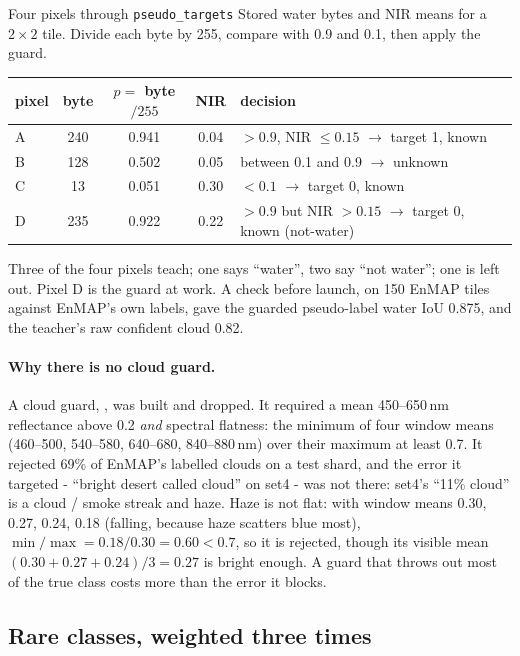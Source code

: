 \begin{worked}[label={we:ftruns:pseudo}]{Four pixels through \texttt{pseudo\_targets}}
Stored water bytes and NIR means for a $2 \times 2$ tile. Divide each byte by 255, compare with 0.9 and 0.1, then
apply the guard.
\begin{center}
\small
\begin{tabular}{lcccl}
\toprule
pixel & byte & $p = $ byte$/255$ & NIR & decision \\
\midrule
A & 240 & 0.941 & 0.04 & $> 0.9$, NIR $\le 0.15$ $\to$ target 1, known \\
B & 128 & 0.502 & 0.05 & between 0.1 and 0.9 $\to$ unknown \\
C & 13 & 0.051 & 0.30 & $< 0.1$ $\to$ target 0, known \\
D & 235 & 0.922 & 0.22 & $> 0.9$ but NIR $> 0.15$ $\to$ target 0, known (not-water) \\
\bottomrule
\end{tabular}
\end{center}
Three of the four pixels teach; one says ``water'', two say ``not water''; one is left out. Pixel D is the guard at
work. A check before launch, on 150 EnMAP tiles against EnMAP's own labels, gave the guarded pseudo-label water IoU
0.875, and the teacher's raw confident cloud 0.82.
\end{worked}

\paragraph{Why there is no cloud guard.} A cloud guard, , was built and dropped. It required a
mean 450--650\,nm reflectance above 0.2 \emph{and} spectral flatness: the minimum of four window means (460--500,
540--580, 640--680, 840--880\,nm) over their maximum at least 0.7. It rejected 69\% of EnMAP's labelled clouds on a test
shard, and the error it targeted - ``bright desert called cloud'' on set4 - was not there: set4's ``11\% cloud'' is a
cloud / smoke streak and haze. Haze is not flat: with window means 0.30, 0.27, 0.24, 0.18 (falling, because haze
scatters blue most), $\min/\max = 0.18 / 0.30 = 0.60 < 0.7$, so it is rejected, though its visible mean $(0.30 + 0.27 +
0.24)/3 = 0.27$ is bright enough. A guard that throws out most of the true class costs more than the error it blocks.

\subsection{Rare classes, weighted three times}

